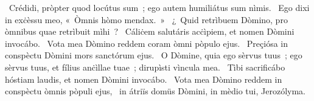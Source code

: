 ~Crédidi, pròpter quod locútus sum~; ego autem humiliátus sum nìmis. 
~Ego dixi in exċèssu meo, «~Òmnis hòmo mendax.~»
~¿~Quid retrìbuem Dòmino, pro òmnibus quae retrìbuit mìhi~? 
~Cáliċem salutáris acċìpiem, et nomen Dòmini invocábo. 
~Vota mea Dòmino reddem coram òmni pòpulo ejus. 
~Preçiósa in conspèctu Dòmini mors sanctórum ejus. 
~O Dòmine, quia ego sèrvus tuus~; ego sèrvus tuus, et fílius anċìllae tuae~; dirupìsti vìncula mea. 
~Tìbi sacrificábo hóstiam laudis, et nomen Dòmini invocábo. 
~Vota mea Dòmino reddem in conspèctu òmnis pòpuli ejus, 
~in átriïs domüs Dòmini, in mèdio tui, Jerozólyma. 
